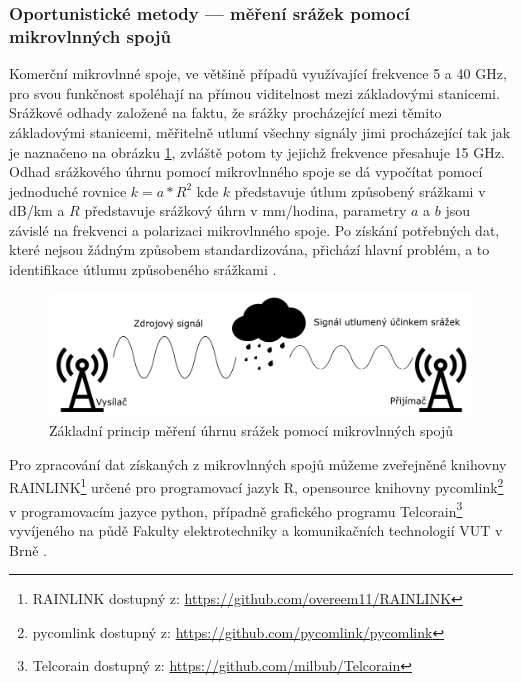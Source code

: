 \subsubsection{Oportunistické metody — měření srážek pomocí mikrovlnných spojů}
\par Komerční mikrovlnné spoje, ve většině případů využívající frekvence 5 a 40 GHz, pro svou funkčnost spoléhají na přímou viditelnost mezi základovými stanicemi. Srážkové odhady založené na faktu, že srážky procházející mezi těmito základovými stanicemi, měřitelně utlumí všechny signály jimi procházející tak jak je naznačeno na obrázku \ref{obr:CML}, zvláště potom ty jejichž frekvence přesahuje 15 GHz. Odhad srážkového úhrnu pomocí mikrovlnného spoje se dá vypočítat pomocí jednoduché rovnice $k=a*R^{2}$ kde $k$ představuje útlum způsobený srážkami v dB/km a $R$ představuje srážkový úhrn v mm/hodina, parametry $a$ a $b$ jsou  závislé na frekvenci a polarizaci mikrovlnného spoje. Po získání potřebných dat, které nejsou žádným způsobem standardizována, přichází hlavní problém, a to identifikace útlumu způsobeného srážkami \cite{Chwala2019, Bubniak20221011}. 

    \begin{figure}[!h]
      \begin{center}
        \includegraphics[scale=0.5]{obrazky/prace/cml.pdf}
      \end{center}
      \caption[CML]{Základní princip měření úhrnu srážek pomocí mikrovlnných spojů \cite{Chwala2019}}
      \label{obr:CML}
    \end{figure}
    
\par Pro zpracování dat získaných z mikrovlnných spojů můžeme zveřejněné knihovny RAINLINK\footnote{RAINLINK dostupný z: \url{https://github.com/overeem11/RAINLINK}} určené pro programovací jazyk R, opensource knihovny pycomlink\footnote{pycomlink dostupný z: \url{https://github.com/pycomlink/pycomlink}} v programovacím jazyce python, případně grafického programu Telcorain\footnote{Telcorain dostupný z: \url{https://github.com/milbub/Telcorain}} vyvíjeného na půdě Fakulty elektrotechniky a komunikačních technologií VUT v Brně \cite{Chwala2019, Bubniak20221011}.

